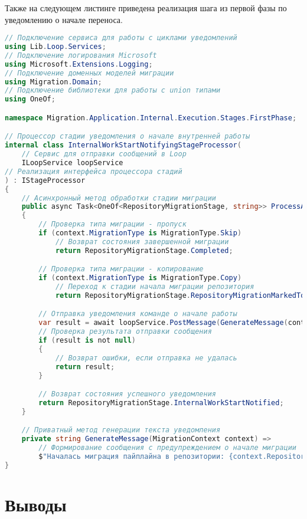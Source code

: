 Также на следующем листинге приведена реализация шага из первой фазы по уведомлению о начале переноса.

\begin{lstlisting}[language=c#,label={lst:internal-work-started-step},caption={Код шага оповещения о старте начала работ}]
// Подключение сервиса для работы с циклами уведомлений
using Lib.Loop.Services;
// Подключение логирования Microsoft
using Microsoft.Extensions.Logging;
// Подключение доменных моделей миграции
using Migration.Domain;
// Подключение библиотеки для работы с union типами
using OneOf;

namespace Migration.Application.Internal.Execution.Stages.FirstPhase;

// Процессор стадии уведомления о начале внутренней работы
internal class InternalWorkStartNotifyingStageProcessor(
    // Сервис для отправки сообщений в Loop
    ILoopService loopService
// Реализация интерфейса процессора стадий
) : IStageProcessor
{
    // Асинхронный метод обработки стадии миграции
    public async Task<OneOf<RepositoryMigrationStage, string>> ProcessAsync(MigrationContext context, ILogger logger)
    {
        // Проверка типа миграции - пропуск
        if (context.MigrationType is MigrationType.Skip)
            // Возврат состояния завершенной миграции
            return RepositoryMigrationStage.Completed;

        // Проверка типа миграции - копирование
        if (context.MigrationType is MigrationType.Copy)
            // Переход к стадии начала миграции репозитория
            return RepositoryMigrationStage.RepositoryMigrationMarkedToStart;

        // Отправка уведомления команде о начале работы
        var result = await loopService.PostMessage(GenerateMessage(context), context.Team);
        // Проверка результата отправки сообщения
        if (result is not null)
        {
            // Возврат ошибки, если отправка не удалась
            return result;
        }

        // Возврат состояния успешного уведомления
        return RepositoryMigrationStage.InternalWorkStartNotified;
    }

    // Приватный метод генерации текста уведомления
    private string GenerateMessage(MigrationContext context) =>
        // Формирование сообщения с предупреждением о начале миграции
        $"Началась миграция пайплайна в репозитории: {context.RepositoryName}. ** Пожалуйста, не меняйте его Workflow ** ";
}
\end{lstlisting}

\section{Выводы} \label{sec:conclusion}
